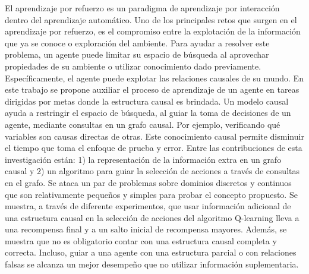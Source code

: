 
\begin{resumen}


El aprendizaje por refuerzo es un paradigma de aprendizaje por interacción 
dentro del aprendizaje automático. Uno de los principales retos que surgen en 
el aprendizaje por refuerzo, es el compromiso entre la 
explotación de la información que ya se conoce o 
exploración del ambiente. Para ayudar a resolver este problema, 
un agente puede limitar su espacio de búsqueda al 
aprovechar propiedades de su ambiente o utilizar 
conocimiento dado previamente. Específicamente, el agente
puede explotar las relaciones causales de su mundo. En este
trabajo se propone auxiliar el proceso de aprendizaje de
un agente en tareas dirigidas por metas donde la estructura
causal es brindada. 
Un modelo causal ayuda a restringir el espacio de búsqueda, al
guiar la toma de decisiones de un agente, mediante consultas en un grafo causal. Por ejemplo, verificando qué variables 
son causas directas de otras.
Este conocimiento causal permite disminuir el
tiempo que toma el enfoque de prueba y error.
Entre las contribuciones de esta investigación están: 1)
la representación de la información extra en un grafo causal y 2) un algoritmo para guiar la selección de acciones 
a través de consultas en el grafo.
Se ataca un par de problemas sobre dominios discretos y continuos que son relativamente pequeños y simples para
probar el concepto propuesto.
Se muestra, a través de diferente experimentos, que
usar información adicional de una estructura causal
en la selección de acciones del algoritmo Q-learning
lleva a una recompensa final y a un salto inicial de
recompensa mayores. Además, se muestra que
no es obligatorio contar con una estructura causal 
completa y correcta. Incluso, guiar a una agente con una estructura parcial o con relaciones falsas se alcanza un mejor desempeño que no utilizar información suplementaria.

\end{resumen}